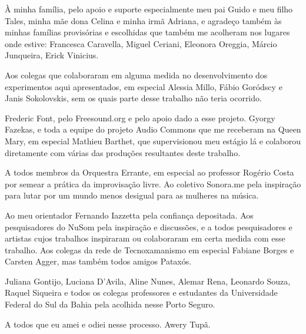 \documentclass[
	12pt,				%
	openright,			%
	twoside,			%
	a4paper,			%
	english,			%
	french,				%
	spanish,			%
	brazil				%
	]{abntex2}
\begin{document}

\begin{agradecimentos}
%
À minha família, pelo apoio e suporte especialmente meu pai Guido e meu filho Tales, minha mãe dona Celina e minha irmã Adriana, e agradeço também às minhas famílias provisórias e escolhidas que também me acolheram nos lugares onde estive: Francesca Caravella, Miguel Ceriani, Eleonora Oreggia, Márcio Junqueira, Erick Vinicius.

Aos colegas que colaboraram em alguma medida no desenvolvimento dos experimentos aqui apresentados, em especial Alessia Millo, Fábio Goródscy e Janis Sokolovskis, sem os quais parte desse trabalho não teria ocorrido.

Frederic Font, pelo Freesound.org e pelo apoio dado a esse projeto. Gyorgy Fazekas, e toda a equipe do projeto Audio Commons que me receberam na Queen Mary, em especial Mathieu Barthet, que supervisionou meu estágio lá e colaborou diretamente com várias das produções resultantes deste trabalho. 

A todos membros da Orquestra Errante, em especial ao professor Rogério Costa por semear a prática da improvisação livre. Ao coletivo Sonora.me pela inspiração para lutar por um mundo menos desigual para as mulheres na música. 

Ao meu orientador Fernando Iazzetta pela confiança depositada. Aos pesquisadores do NuSom pela inspiração e discussões, e a todos pesquisadores e artistas cujos trabalhos inspiraram ou colaboraram em certa medida com esse trabalho. Aos colegas da rede de Tecnoxamanismo em especial Fabiane Borges e Carsten Agger, mas também todos amigos Pataxós.

Juliana Gontijo, Luciana D'Avila, Aline Nunes, Alemar Rena, Leonardo Souza, Raquel Siqueira e todos os colegas professores e estudantes da Universidade Federal do Sul da Bahia pela acolhida nesse Porto Seguro. 

A todos que eu amei e odiei nesse processo. 
Awery Tupã.


%
%



%
\end{agradecimentos}
\end{document}
